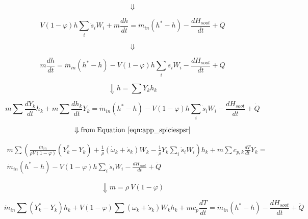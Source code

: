 \begin{equation*}
	\Downarrow
\end{equation*}


\begin{equation*}
	V\left(1-\varphi\right)h\sum_{i}{{\dot{s}}_iW_i}+m\frac{dh}{dt}={\dot{m}}_{in}\left(h^\ast-h\right)-\frac{dH_{soot}}{dt}+\dot{Q}
\end{equation*}

\begin{equation*}
	\Downarrow
\end{equation*}

\begin{equation*}
	m\frac{dh}{dt}={\dot{m}}_{in}\left(h^\ast-h\right)-V\left(1-\varphi\right)h\sum_{i}{{\dot{s}}_iW_i}-\frac{dH_{soot}}{dt}+\dot{Q}
\end{equation*}

\begin{equation*}
	\Downarrow h=\sum{Y_kh_k}
\end{equation*}

\begin{equation*}
	m\sum{\frac{dY_k}{dt}h_k}+m\sum{\frac{dh_k}{dt}Y_k}={\dot{m}}_{in}\left(h^\ast-h\right)-V\left(1-\varphi\right)h\sum_{i}{{\dot{s}}_iW_i}-\frac{dH_{soot}}{dt}+\dot{Q}
\end{equation*}

\begin{equation*}
	\Downarrow \mathrm{from \: Equation~\ref{eqn:app_spiciespsr}}
\end{equation*}


\begin{equation*}
	\begin{split}
	m\sum{\left(\frac{{\dot{m}}_{in}}{\rho V\left(1-\varphi\right)}\left(Y_k^\ast-Y_k\right)
		+
	\frac{1}{\rho}\left({\dot{\omega}}_k
	+
	{\dot{s}}_k\right)W_k-\frac{1}{\rho}Y_k\sum_{i}{{\dot{s}}_iW_i}\right)h_k}
	+
	m\sum{c_{p,k}\frac{dT}{dt}Y_k}
	=\\
	{\dot{m}}_{in}\left(h^\ast-h\right)-V\left(1-\varphi\right)h\sum_{i}{{\dot{s}}_iW_i}-\frac{dH_{soot}}{dt}+\dot{Q}
	\end{split}
\end{equation*}

\begin{equation*}
	\Downarrow m=\rho\ V\left(1-\varphi\right)
\end{equation*}

\begin{equation*}
	{\dot{m}}_{in}\sum\left(Y_k^\ast-Y_k\right)h_k+V\left(1-\varphi\right)\sum{\left({\dot{\omega}}_k+{\dot{s}}_k\right)W_kh_k}+mc_p\frac{dT}{dt}={\dot{m}}_{in}\left(h^\ast-h\right)-\frac{dH_{soot}}{dt}+\dot{Q}
\end{equation*}

